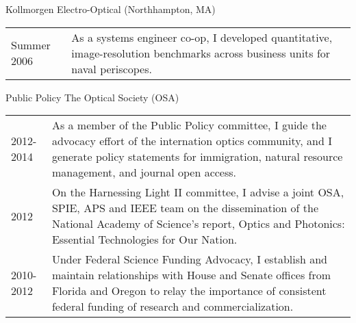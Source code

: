 \documentclass[a4paper]{article}
\renewcommand{\section}[2]{\LARGE #1 \hspace{0.95in} \large #2 \normalsize \vspace{0.25in}}
\begin{document}
\vspace{0.5in}

\section{}{\hspace{0.95in}Kollmorgen Electro-Optical \small(Northhampton, MA)}

\begin{tabular}[t]{l@{\hspace{1in}} m{}}
	Summer 2006 & As a systems engineer co-op, I developed quantitative, image-resolution benchmarks across business units for naval periscopes. 
\end{tabular}

\vspace{0.5in}

\section{Public Policy}{\hspace{-0.5in} The Optical Society \small (OSA)}
\begin{tabular}[t]{l@{\hspace{1.25in}} m{}}
	2012-2014 & As a member of the Public Policy committee, I guide the advocacy effort of the internation optics community, and I generate policy statements for immigration, natural resource management, and journal open access.\\
	2012 & On the Harnessing Light II committee, I advise a joint \small OSA, SPIE, APS \normalsize and \small IEEE \normalsize team on the dissemination  of the National Academy of Science's report, Optics and Photonics: Essential Technologies for Our Nation. \\ 
	2010-2012 & Under Federal Science Funding Advocacy, I establish and maintain relationships with House and Senate offices from Florida and Oregon to relay the importance of consistent federal funding of research and commercialization.
\end{tabular}

\end{document}
